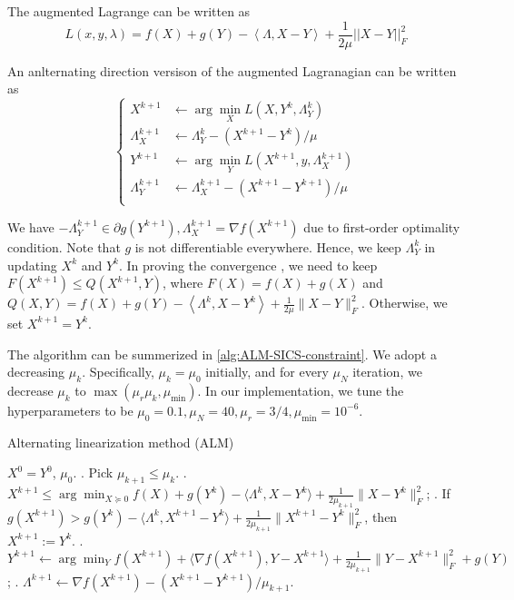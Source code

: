 \documentclass[conference,onecolumn,12pt]{IEEEtran}
\newcommand{\<}{\langle}
\renewcommand{\>}{\rangle}
\numberwithin{equation}{section}
\begin{document}
The augmented Lagrange can be written as
\begin{equation}
    \label{spinv2alag}
    L(x,y,\lambda)=f(X)+g(Y)-\left<\Lambda,X-Y\right>+\frac{1}{2\mu}||X-Y||_F^2
\end{equation}

An anlternating direction versison of the augmented Lagranagian can be written as
\begin{equation}
    \label{spinv2admm}
    \begin{cases}
        X^{k+1}&\gets\arg\min_X L(X,Y^k,\Lambda^k_Y)\\
        \Lambda_X^{k+1}&\gets\Lambda_Y^k-(X^{k+1}-Y^k)/\mu\\
        Y^{k+1}&\gets\arg\min_Y L(X^{k+1},y,\Lambda_X^{k+1})\\
        \Lambda_Y^{k+1}&\gets\Lambda_X^{k+1}-(X^{k+1}-Y^{k+1})/\mu\\
    \end{cases}
\end{equation}

We have $-\Lambda_Y^{k+1}\in \partial g(Y^{k+1}), \Lambda_X^{k+1}=\nabla f(X^{k+1})$ due to first-order optimality condition. Note that $g$ is not differentiable everywhere. Hence, we keep $\Lambda_Y^k$ in updating $X^k$ and $Y^k$. In proving the convergence \cite{yang2011alternating}, we need to keep $F(X^{k+1})\leq Q(X^{k+1},Y)$, where $F(X)=f(X)+g(X)$ and $Q(X,Y)=f(X)+g(Y)-\left<\Lambda^k,X-Y^k\right>+\frac{1}{2\mu}\|X-Y\|_F^2$. Otherwise, we set $X^{k+1}=Y^k$. 

The algorithm can be summerized in \ref{alg:ALM-SICS-constraint}. We adopt a decreasing $\mu_k$. Specifically, $\mu_k=\mu_0$ initially, and for every $\mu_N$ iteration, we decrease $\mu_k$ to $\max(\mu_r\mu_k,\mu_{\min})$. In our implementation, we tune the hyperparameters to be $\mu_0=0.1,\mu_N=40,\mu_r=3/4,\mu_{\min}=10^{-6}$.
    \begin{algorithm}[!htbp]\caption{Alternating linearization method (ALM)}\label{alg:ALM-SICS-constraint}
        \begin{algorithmic}
         $X^0=Y^0$, $\mu_0$.
        . Pick $\mu_{k+1}\leq \mu_{k}$.
        . $ X^{k+1}\leq \arg\min_{X\succeq 0} f(X) + g (Y^k) - \langle\Lambda^k, X-Y^k\rangle + \frac{1}{2\mu_{k+1}}\|X-Y^k\|_F^2$;
        .  If $  g(X^{k+1})> g (Y^k) - \langle\Lambda^k,X^{k+1}-Y^k\rangle + \frac{1}{2\mu_{k+1}}\|X^{k+1}-Y^k\|_F^2$, then  $X^{k+1}  := Y^k$.
        . $ Y^{k+1}\gets \arg\min_{Y} f(X^{k+1}) + \langle\nabla f(X^{k+1}),Y-X^{k+1}\rangle + \frac{1}{2\mu_{k+1}}\|Y-X^{k+1}\|_F^2 + g(Y)$;
        . $\Lambda^{k+1}\gets\nabla f(X^{k+1})- (X^{k+1}-Y^{k+1})/\mu_{k+1}$.
        \ENDFOR
        \end{algorithmic}
        \end{algorithm}
\end{document}
